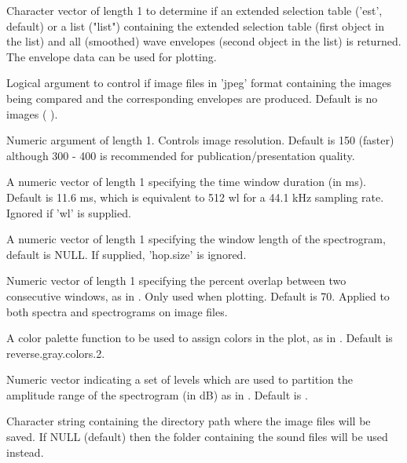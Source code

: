 \documentclass[letterpaper]{book}
\begin{document}
\begin{Arguments}
\begin{ldescription}
\item[\code{output}] Character vector of length 1 to determine if an extended selection table ('est', default) or a list ("list") containing the extended selection table (first object in the list) and all (smoothed) wave envelopes (second object in the list) is returned. The envelope data can be used for plotting.

\item[\code{img}] Logical argument to control if image files in 'jpeg' format containing the images being compared and the corresponding envelopes are produced. Default is no images ( ).

\item[\code{res}] Numeric argument of length 1. Controls image resolution. Default is 150 (faster) although 300 - 400 is recommended for publication/presentation quality.

\item[\code{hop.size}] A numeric vector of length 1 specifying the time window duration (in ms). Default is 11.6 ms, which is equivalent to 512 wl for a 44.1 kHz sampling rate. Ignored if 'wl' is supplied.

\item[\code{wl}] A numeric vector of length 1 specifying the window length of the spectrogram, default 
is NULL. If supplied, 'hop.size' is ignored.

\item[\code{ovlp}] Numeric vector of length 1 specifying the percent overlap between two 
consecutive windows, as in . Only used when plotting. Default is 70. Applied to both spectra and spectrograms on image files.

\item[\code{pal}] A color palette function to be used to assign colors in the 
plot, as in . Default is reverse.gray.colors.2.

\item[\code{collevels}] Numeric vector indicating a set of levels which are used to partition the amplitude range of the spectrogram (in dB) as in . Default is .

\item[\code{dest.path}] Character string containing the directory path where the image files will be saved. If NULL (default) then the folder containing the sound files will be used instead.
\end{ldescription}
\end{Arguments}
\end{document}
